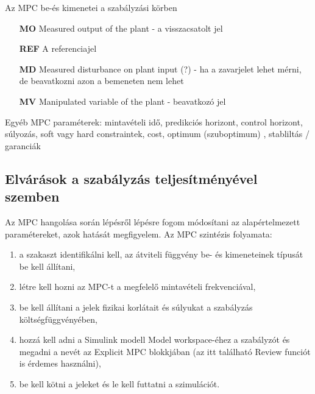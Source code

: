 \vspace{12pt}


\begin{table*}[h]
	\caption{Az MPC be-és kimenetei a szabályzási körben}
	\label{nomencl_mpcsignals}
	\begin{itemize}[noitemsep,topsep=0pt,parsep=2pt,partopsep=4pt,leftmargin=42pt]
		\item[\textbf{MO}] Measured output of the plant - a visszacsatolt jel
		\item[\textbf{REF}] A referenciajel %
		\item[\textbf{MD}] Measured disturbance on plant input (?) - ha a zavarjelet lehet mérni, de beavatkozni azon a bemeneten nem lehet
		\item[\textbf{MV}] Manipulated variable of the plant - beavatkozó jel 
	\end{itemize}
\end{table*}
Egyéb MPC paraméterek: mintavételi idő, predikciós horizont, control horizont, súlyozás, soft vagy hard constraintek, cost, optimum (szuboptimum) , stabliltás / garanciák






\subsection{Elvárások a szabályzás teljesítményével szemben}

Az MPC hangolása során %
lépésről lépésre fogom módosítani az alapértelmezett paramétereket, azok hatását megfigyelem.
Az MPC szintézis folyamata:%


\begin{enumerate}[noitemsep,topsep=0pt,parsep=2pt,partopsep=4pt,leftmargin=30pt]
	\item a szakaszt identifikálni kell, az átviteli függvény be- és kimeneteinek típusát be kell állítani,
	\item létre kell hozni az MPC-t a megfelelő mintavételi frekvenciával,
	\item be kell állítani a jelek fizikai korlátait és súlyukat a szabályzás költségfüggvényében,
	\item hozzá kell adni a Simulink modell Model workspace-éhez a szabályzót és megadni a nevét az Explicit MPC blokkjában (az itt található Review funciót is érdemes használni),
	\item be kell kötni a jeleket és le kell futtatni a szimulációt.
	
\end{enumerate}

